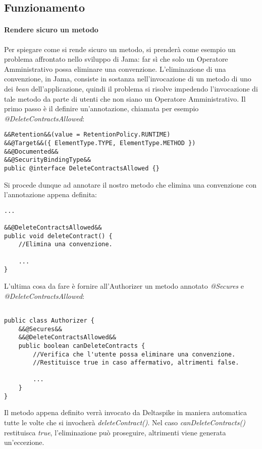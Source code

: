 \subsection{Funzionamento}
\paragraph{Rendere sicuro un metodo}
Per spiegare come si rende sicuro un metodo, si prenderà come esempio un problema affrontato nello sviluppo di Jama: far sì che solo un Operatore Amministrativo possa eliminare una convenzione. L'eliminazione di una convenzione, in Jama, consiste in sostanza nell'invocazione di un metodo di uno dei \textit{bean} dell'applicazione, quindi il problema si risolve impedendo l'invocazione di tale metodo da parte di utenti che non siano un Operatore Amministrativo.\newline
Il primo passo è il definire un'annotazione, chiamata per esempio \textsl{@DeleteContractsAllowed}:

\begin{lstlisting}
&&Retention&&(value = RetentionPolicy.RUNTIME)
&&@Target&&({ ElementType.TYPE, ElementType.METHOD })
&&@Documented&&
&&@SecurityBindingType&&
public @interface DeleteContractsAllowed {}
\end{lstlisting}

Si procede dunque ad annotare il nostro metodo che elimina una convenzione con l'annotazione appena definita:

\begin{lstlisting}
...

&&@DeleteContractsAllowed&&
public void deleteContract() {
	//Elimina una convenzione.
	
	...
}
\end{lstlisting}

L'ultima cosa da fare è fornire all'Authorizer un metodo annotato \textsl{@Secures} e \textsl{@DeleteContractsAllowed}:

\begin{lstlisting}

public class Authorizer {
	&&@Secures&&
	&&@DeleteContractsAllowed&&
	public boolean canDeleteContracts {
		//Verifica che l'utente possa eliminare una convenzione.
		//Restituisce true in caso affermativo, altrimenti false.
	
		...
	}
}
\end{lstlisting}

Il metodo appena definito verrà invocato da Deltaspike in maniera automatica tutte le volte che si invocherà \textsl{deleteContract()}. Nel caso \textsl{canDeleteContracts()} restituisca \textsl{true}, l'eliminazione può proseguire, altrimenti viene generata un'eccezione.

